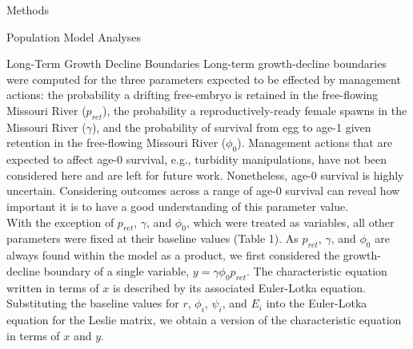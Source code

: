 \documentclass[12pt]{article}
\begin{document}
\begin{section}{Methods}
\begin{subsection}{Population Model Analyses}
\begin{subsubsection}{Long-Term Growth Decline Boundaries}
Long-term growth-decline boundaries were computed for the three parameters expected to be effected by management actions: the probability a drifting free-embryo is retained in the free-flowing Missouri River ($p_{ret}$), the probability a reproductively-ready female spawns in the Missouri River ($\gamma$), and the probability of survival from egg to age-1 given retention in the free-flowing Missouri River ($\phi_0$).  Management actions that are expected to affect age-0 survival, e.g., turbidity manipulations, have not been considered here and are left for future work.  Nonetheless, age-0 survival is highly uncertain.  Considering outcomes across a range of age-0 survival can reveal how important it is to have a good understanding of this parameter value.\\

With the exception of $p_{ret}$, $\gamma$, and $\phi_0$, which were treated as variables, all other parameters were fixed at their baseline values (Table 1).  As $p_{ret}$, $\gamma$, and $\phi_0$ are always found within the model as a product, we first considered the growth-decline boundary of a single variable, $y=\gamma\phi_0 p_{ret}$.  The characteristic equation written in terms of $x$ is described by its associated Euler-Lotka equation.%
  Substituting the baseline values for $r$, $\phi_i$, $\psi_i$, and $E_i$ into the Euler-Lotka equation for the Leslie matrix, we obtain
 a version of the characteristic equation in terms of $x$ and $y$.\\
  

\end{subsubsection}
\end{subsection}
\end{section}
\end{document}
